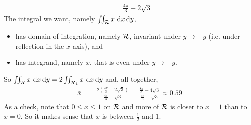 \begin{eg}
\begin{align*}
&=\frac{4\pi}{3}-2\sqrt{3}
\end{align*}
The integral we want, namely $\iint_{\mathcal{R}} x\  \mathrm{d}x\,\mathrm{d}y$,
\begin{itemize}\itemsep1pt \parskip0pt 
\item 
has domain of integration, namely $\mathcal{R}$,  invariant 
under $y\rightarrow -y$ (i.e. under reflection in the $x$-axis), and
\item 
has integrand, namely $x$, that is even under $y\rightarrow -y$.
\end{itemize}
So $\iint_{\mathcal{R}} x\  \mathrm{d}x\,\mathrm{d}y
  =2\iint_{\mathcal{R}_1} x\  \mathrm{d}x\,\mathrm{d}y$ 
and, all together,
\begin{align*}
\bar x 
  &= \frac{2\left(\frac{4\pi}{3}-2\sqrt{3}\right)}{\frac{4\pi}{3}-\sqrt{3}}
  = \frac{\frac{8\pi}{3}-4\sqrt{3}}{\frac{4\pi}{3}-\sqrt{3}}
  \approx 0.59
\end{align*}
As a check, note that $0\le x\le 1$ on $\mathcal{R}$ and more of $\mathcal{R}$ is closer 
to $x=1$ than to $x=0$. So it makes sense that $\bar x$ is between
$\frac{1}{2}$ and $1$.
\end{eg}



